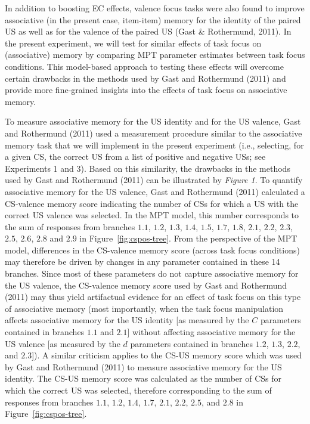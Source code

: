 \documentclass[
  doc,floatsintext]{apa6}
\begin{document}
In addition to boosting EC effects, valence focus tasks were also found to improve associative (in the present case, item-item) memory for the identity of the paired US as well as for the valence of the paired US (Gast \& Rothermund, 2011).
In the present experiment, we will test for similar effects of task focus on (associative) memory by comparing MPT parameter estimates between task focus conditions.
This model-based approach to testing these effects will overcome certain drawbacks in the methods used by Gast and Rothermund (2011) and provide more fine-grained insights into the effects of task focus on associative memory.

To measure associative memory for the US identity and for the US valence, Gast and Rothermund (2011) used a measurement procedure similar to the associative memory task that we will implement in the present experiment (i.e., selecting, for a given CS, the correct US from a list of positive and negative USs; see Experiments 1 and 3).
Based on this similarity, the drawbacks in the methods used by Gast and Rothermund (2011) can be illustrated by \emph{Figure 1}.
To quantify associative memory for the US valence, Gast and Rothermund (2011) calculated a CS-valence memory score indicating the number of CSs for which a US with the correct US valence was selected.
In the MPT model, this number corresponds to the sum of responses from branches \(1.1\), \(1.2\), \(1.3\), \(1.4\), \(1.5\), \(1.7\), \(1.8\), \(2.1\), \(2.2\), \(2.3\), \(2.5\), \(2.6\), \(2.8\) and \(2.9\) in Figure~\ref{fig:cspos-tree}.
From the perspective of the MPT model, differences in the CS-valence memory score (across task focus conditions) may therefore be driven by changes in any parameter contained in these 14 branches.
Since most of these parameters do not capture associative memory for the US valence, the CS-valence memory score used by Gast and Rothermund (2011) may thus yield artifactual evidence for an effect of task focus on this type of associative memory (most importantly, when the task focus manipulation affects associative memory for the US identity {[}as measured by the \(C\) parameters contained in branches \(1.1\) and \(2.1\){]} without affecting associative memory for the US valence {[}as measured by the \(d\) parameters contained in branches \(1.2\), \(1.3\), \(2.2\), and \(2.3\){]}).
A similar criticism applies to the CS-US memory score which was used by Gast and Rothermund (2011) to measure associative memory for the US identity.
The CS-US memory score was calculated as the number of CSs for which the correct US was selected, therefore corresponding to the sum of responses from branches \(1.1\), \(1.2\), \(1.4\), \(1.7\), \(2.1\), \(2.2\), \(2.5\), and \(2.8\) in Figure~\ref{fig:cspos-tree}.
\end{document}
